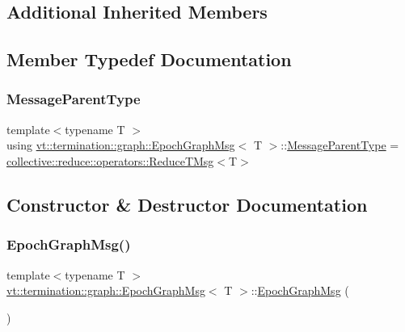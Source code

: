 \subsection*{Additional Inherited Members}


\subsection{Member Typedef Documentation}
\mbox{\label{structvt_1_1termination_1_1graph_1_1_epoch_graph_msg_ae8827a1b3949d471a0de4d107f20eb02}} 
\subsubsection{\texorpdfstring{Message\+Parent\+Type}{MessageParentType}}
{\footnotesize\ttfamily template$<$typename T $>$ \\
using \hyperlink{structvt_1_1termination_1_1graph_1_1_epoch_graph_msg}{vt\+::termination\+::graph\+::\+Epoch\+Graph\+Msg}$<$ T $>$\+::\hyperlink{structvt_1_1collective_1_1reduce_1_1operators_1_1_reduce_t_msg_a0dd12197060e03bb7e73dbe299044f22}{Message\+Parent\+Type} =  \hyperlink{structvt_1_1collective_1_1reduce_1_1operators_1_1_reduce_t_msg}{collective\+::reduce\+::operators\+::\+Reduce\+T\+Msg}$<$T$>$}



\subsection{Constructor \& Destructor Documentation}
\mbox{\label{structvt_1_1termination_1_1graph_1_1_epoch_graph_msg_a7dd7c3313549d4d61f614bc1ec38a13b}} 
\subsubsection{\texorpdfstring{Epoch\+Graph\+Msg()}{EpochGraphMsg()}\hspace{0.1cm}{\footnotesize\ttfamily [1/2]}}
{\footnotesize\ttfamily template$<$typename T $>$ \\
\hyperlink{structvt_1_1termination_1_1graph_1_1_epoch_graph_msg}{vt\+::termination\+::graph\+::\+Epoch\+Graph\+Msg}$<$ T $>$\+::\hyperlink{structvt_1_1termination_1_1graph_1_1_epoch_graph_msg}{Epoch\+Graph\+Msg} (\begin{DoxyParamCaption}{ }\end{DoxyParamCaption})\hspace{0.3cm}{\ttfamily [default]}}

